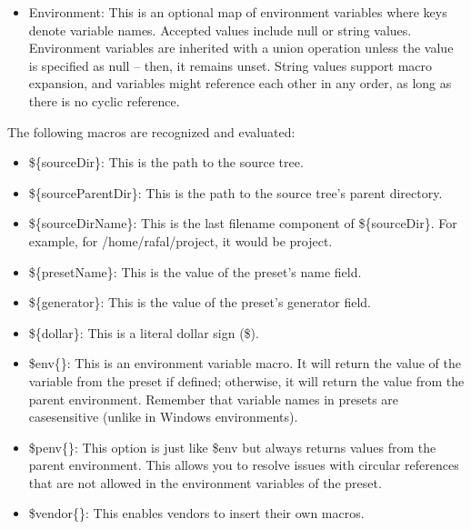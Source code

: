 \begin{itemize}
\item 
Environment: This is an optional map of environment variables where keys denote variable names. Accepted values include null or string values. Environment variables are inherited with a union operation unless the value is specified as null – then, it remains unset. String values support macro expansion, and variables might reference each other in any order, as long as there is no cyclic reference.
\end{itemize}

The following macros are recognized and evaluated:

\begin{itemize}
\item 
\$\{sourceDir\}: This is the path to the source tree.

\item 
\$\{sourceParentDir\}: This is the path to the source tree's parent directory.

\item 
\$\{sourceDirName\}: This is the last filename component of \$\{sourceDir\}.
For example, for /home/rafal/project, it would be project.

\item 
\$\{presetName\}: This is the value of the preset's name field.

\item 
\$\{generator\}: This is the value of the preset's generator field.

\item 
\$\{dollar\}: This is a literal dollar sign (\$).

\item 
\$env\{<variable-name>\}: This is an environment variable macro. It will return the value of the variable from the preset if defined; otherwise, it will return the value from the parent environment. Remember that variable names in presets are casesensitive (unlike in Windows environments).

\item 
\$penv\{<variable-name>\}: This option is just like \$env but always returns values from the parent environment. This allows you to resolve issues with circular references that are not allowed in the environment variables of the preset.

\item 
\$vendor\{<macro-name>\}: This enables vendors to insert their own macros.
\end{itemize}



